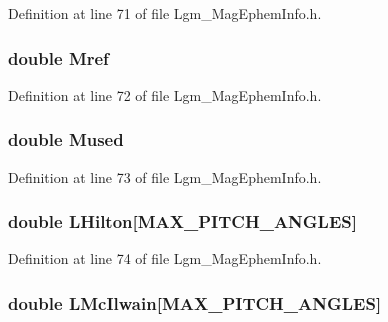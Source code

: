 Definition at line 71 of file Lgm\_\-MagEphemInfo.h.\hypertarget{struct_lgm___mag_ephem_info_48f2de795abc764c809248272a03adbf}{
\subsubsection[{Mref}]{\setlength{\rightskip}{0pt plus 5cm}double {\bf Mref}}}
\label{struct_lgm___mag_ephem_info_48f2de795abc764c809248272a03adbf}




Definition at line 72 of file Lgm\_\-MagEphemInfo.h.\hypertarget{struct_lgm___mag_ephem_info_8cd747b5ee4d9da03a9ff039258c4df6}{
\subsubsection[{Mused}]{\setlength{\rightskip}{0pt plus 5cm}double {\bf Mused}}}
\label{struct_lgm___mag_ephem_info_8cd747b5ee4d9da03a9ff039258c4df6}




Definition at line 73 of file Lgm\_\-MagEphemInfo.h.\hypertarget{struct_lgm___mag_ephem_info_0c60b8e8cbed91a6659e978d407946c6}{
\subsubsection[{LHilton}]{\setlength{\rightskip}{0pt plus 5cm}double {\bf LHilton}\mbox{[}MAX\_\-PITCH\_\-ANGLES\mbox{]}}}
\label{struct_lgm___mag_ephem_info_0c60b8e8cbed91a6659e978d407946c6}




Definition at line 74 of file Lgm\_\-MagEphemInfo.h.\hypertarget{struct_lgm___mag_ephem_info_ef38c562bbdfde054d2171e8183bac95}{
\subsubsection[{LMcIlwain}]{\setlength{\rightskip}{0pt plus 5cm}double {\bf LMcIlwain}\mbox{[}MAX\_\-PITCH\_\-ANGLES\mbox{]}}}
\label{struct_lgm___mag_ephem_info_ef38c562bbdfde054d2171e8183bac95}




